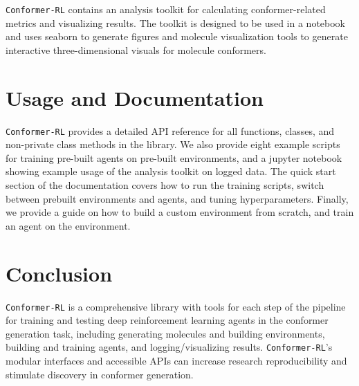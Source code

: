 \documentclass[twoside,11pt]{article}
\newcommand{\code}[1]{\texttt{#1}}
\newcommand{\titleofpaper}{Conformer-RL}
\begin{document}
\code{\titleofpaper} contains an analysis toolkit for calculating conformer-related metrics and visualizing results. The toolkit is designed to be used in a notebook and uses seaborn \citep{waskom2021seaborn} to generate figures and molecule visualization tools to generate interactive three-dimensional visuals for molecule conformers.

\section{Usage and Documentation}
\code{\titleofpaper} provides a detailed API reference for all functions, classes, and non-private class methods in the library. We also provide eight example scripts for training pre-built agents on pre-built environments, and a jupyter notebook showing example usage of the analysis toolkit on logged data. The quick start section of the documentation covers how to run the training scripts, switch between prebuilt environments and agents, and tuning hyperparameters. Finally, we provide a guide on how to build a custom environment from scratch, and train an agent on the environment.

\section{Conclusion}
\code{\titleofpaper} is a comprehensive library with tools for each step of the pipeline for training and testing deep reinforcement learning agents in the conformer generation task, including generating molecules and building environments, building and training agents, and logging/visualizing results. \code{\titleofpaper}'s modular interfaces and accessible APIs can increase research reproducibility and stimulate discovery in conformer generation.



\newpage


\vskip 0.2in




\newpage

\end{document}
